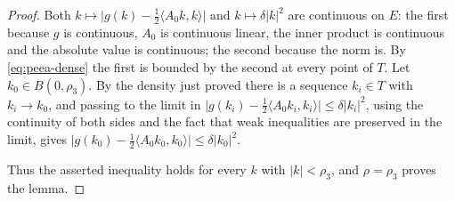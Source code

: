 \begin{proof}
Both $k\mapsto\bigl|g(k)-\tfrac12\langle A_0k,k\rangle\bigr|$ and
$k\mapsto\delta|k|^2$ are continuous on $E$: the first because $g$ is continuous,
$A_0$ is continuous linear, the inner product is continuous and the absolute
value is continuous; the second because the norm is. By \eqref{eq:peea-dense}
the first is bounded by the second at every point of $T$. Let
$k_0\in B(0,\rho_3)$. By the density just proved there is a sequence $k_i\in T$
with $k_i\to k_0$, and passing to the limit in
$\bigl|g(k_i)-\tfrac12\langle A_0k_i,k_i\rangle\bigr|\le\delta|k_i|^2$, using
the continuity of both sides and the fact that weak inequalities are preserved
in the limit, gives
$\bigl|g(k_0)-\tfrac12\langle A_0k_0,k_0\rangle\bigr|\le\delta|k_0|^2$.

Thus the asserted inequality holds for every $k$ with $|k|<\rho_3$, and
$\rho=\rho_3$ proves the lemma.
\end{proof}
